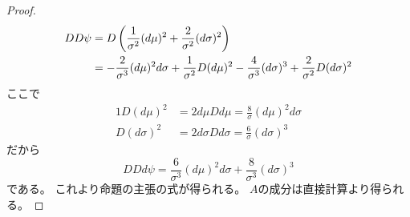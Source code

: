 \documentclass[report]{jlreq}
\begin{document}
\begin{proof}
    \begin{alignat}{1}
        DD\psi
            &=
                D \left({
                    \frac{1}{\sigma^2} (d\mu)^2
                    + \frac{2}{\sigma^2} (d\sigma)^2
                }\right)
                \\
            &=
                - \frac{2}{\sigma^3} (d\mu)^2 d\sigma
                + \frac{1}{\sigma^2} D(d\mu)^2
                - \frac{4}{\sigma^3} (d\sigma)^3
                + \frac{2}{\sigma^2} D(d\sigma)^2
    \end{alignat}
    ここで
    \begin{alignat}{1}
        D(d\mu)^2
            &=
                2 d\mu Dd\mu
            =
                \frac{8}{\sigma} (d\mu)^2 d\sigma
                \\
        D(d\sigma)^2
            &=
                2 d\sigma Dd\sigma
            =
                \frac{6}{\sigma} (d\sigma)^3
    \end{alignat}
    だから
    \begin{equation}
        DDd\psi
            =
                \frac{6}{\sigma^3} (d\mu)^2 d\sigma
                + \frac{8}{\sigma^3} (d\sigma)^3
    \end{equation}
    である。
    これより命題の主張の式が得られる。
    $A$の成分は直接計算より得られる。
\end{proof}
\end{document}
